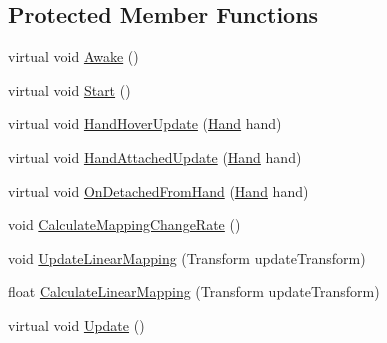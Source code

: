 \subsection*{Protected Member Functions}
\begin{DoxyCompactItemize}
\item 
virtual void \mbox{\hyperlink{class_valve_1_1_v_r_1_1_interaction_system_1_1_linear_drive_a460e787acea9bc3f2b54eabe66f5742b}{Awake}} ()
\item 
virtual void \mbox{\hyperlink{class_valve_1_1_v_r_1_1_interaction_system_1_1_linear_drive_ac74f5d84bd359da256b3f1cf18e03975}{Start}} ()
\item 
virtual void \mbox{\hyperlink{class_valve_1_1_v_r_1_1_interaction_system_1_1_linear_drive_a405389e1f4b635a61139fa99d9eff8e2}{Hand\+Hover\+Update}} (\mbox{\hyperlink{class_valve_1_1_v_r_1_1_interaction_system_1_1_hand}{Hand}} hand)
\item 
virtual void \mbox{\hyperlink{class_valve_1_1_v_r_1_1_interaction_system_1_1_linear_drive_a56727bf866a9b6bf25e7d3d6d4e4c964}{Hand\+Attached\+Update}} (\mbox{\hyperlink{class_valve_1_1_v_r_1_1_interaction_system_1_1_hand}{Hand}} hand)
\item 
virtual void \mbox{\hyperlink{class_valve_1_1_v_r_1_1_interaction_system_1_1_linear_drive_aa50628eb960189732449695aa3b3ad36}{On\+Detached\+From\+Hand}} (\mbox{\hyperlink{class_valve_1_1_v_r_1_1_interaction_system_1_1_hand}{Hand}} hand)
\item 
void \mbox{\hyperlink{class_valve_1_1_v_r_1_1_interaction_system_1_1_linear_drive_ab416b3c92ed502354a43fbef83cc1997}{Calculate\+Mapping\+Change\+Rate}} ()
\item 
void \mbox{\hyperlink{class_valve_1_1_v_r_1_1_interaction_system_1_1_linear_drive_a3cdddbe2e588f05cc21e70cdace58b63}{Update\+Linear\+Mapping}} (Transform update\+Transform)
\item 
float \mbox{\hyperlink{class_valve_1_1_v_r_1_1_interaction_system_1_1_linear_drive_ab58d91ba45acbbe00f0bcea8d9963d28}{Calculate\+Linear\+Mapping}} (Transform update\+Transform)
\item 
virtual void \mbox{\hyperlink{class_valve_1_1_v_r_1_1_interaction_system_1_1_linear_drive_a0cccb08f1c198775cc1ebe491d188520}{Update}} ()
\end{DoxyCompactItemize}
